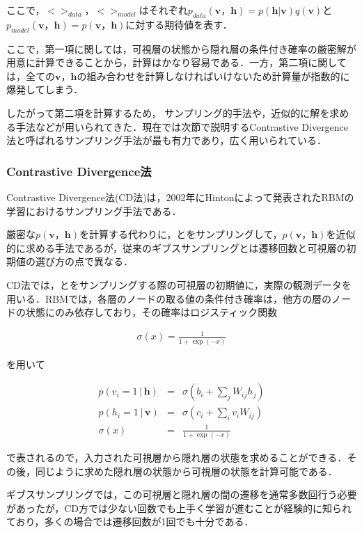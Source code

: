 ここで，$<>_{data}$，$<>_{model}$はそれぞれ$p_{data}(\bm{v}，\bm{h})=p(\bm{h}|\bm{v})q(\bm{v})$と$p_{model}(\bm{v}，\bm{h})=p(\bm{v}，\bm{h})$に対する期待値を表す．

ここで，第一項に関しては，可視層の状態から隠れ層の条件付き確率の厳密解が用意に計算できることから，計算はかなり容易である．一方，第二項に関しては，全ての$\bm{v}$，$\bm{h}$の組み合わせを計算しなければいけないため計算量が指数的に爆発してしまう．

したがって第二項を計算するため， サンプリング的手法や，近似的に解を求める手法などが用いられてきた．現在では次節で説明するContrastive Divergence法と呼ばれるサンプリング手法が最も有力であり，広く用いられている．

\subsubsection{Contrastive Divergence法}
Contrastive Divergence法(CD法)は，2002年にHintonによって発表されたRBMの学習におけるサンプリング手法である\cite{CD}．

厳密な$p(\bm{v}，\bm{h})$を計算する代わりに，とをサンプリングして，$p(\bm{v}，\bm{h})$を近似的に求める手法であるが，従来のギブスサンプリングとは遷移回数と可視層の初期値の選び方の点で異なる．

CD法では，とをサンプリングする際の可視層の初期値に，実際の観測データを用いる．RBMでは，各層のノードの取る値の条件付き確率は，他方の層のノードの状態にのみ依存しており，その確率はロジスティック関数

\begin{eqnarray}
  \sigma(x)= \frac{1}{1 + \exp(-x)}  
 \end{eqnarray}

を用いて

\begin{eqnarray}
	p(v_i=1│\bm{h}) & = & \sigma(b_i+ \sum_j W_{ij} h_j) \\
	p(h_i=1│\bm{v}) & = & \sigma(c_i+ \sum_i v_i W_{ij}) \\
	\sigma(x)		& = & \frac{1}{1 + \exp(-x)}
\end{eqnarray}

で表されるので，入力された可視層から隠れ層の状態を求めることができる．その後，同じように求めた隠れ層の状態から可視層の状態を計算可能である．

ギブスサンプリングでは，この可視層と隠れ層の間の遷移を通常多数回行う必要があったが，CD方では少ない回数でも上手く学習が進むことが経験的に知られており，多くの場合では遷移回数が1回でも十分である\cite{Hinton-guide,Bengio-AI,CD}．


